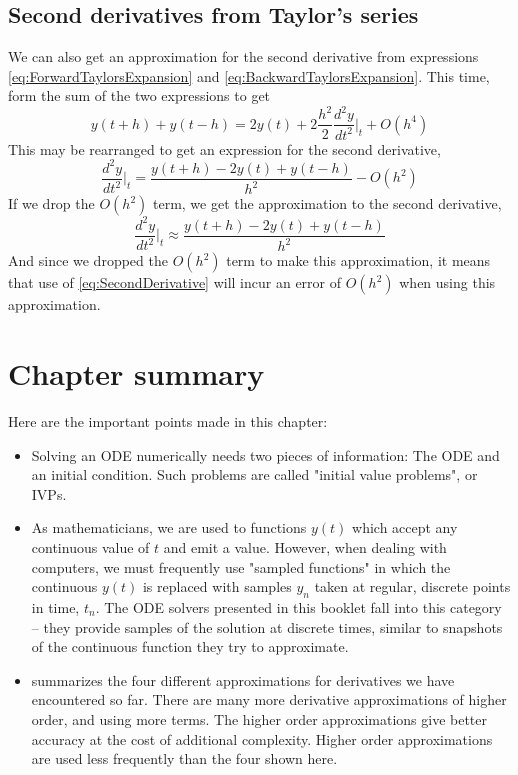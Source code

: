 \documentclass[hidelinks,notitlepage]{book}
\begin{document}
\subsection{Second derivatives from Taylor's series}
We can also get an approximation for the second derivative from expressions \cref{eq:ForwardTaylorsExpansion} and \cref{eq:BackwardTaylorsExpansion}.  This time, form the sum of the two expressions to get
\begin{equation}
\nonumber
\label{eq:TaylorsExpansionSum}
y(t+h) + y(t-h) = 2 y(t)
+ 2 \frac{h^2}{2} \frac{d^2 y}{d t^2} \biggr\rvert_{t}
+O(h^4)
\end{equation}
This may be rearranged to get an expression for the second derivative,
\begin{equation}
\nonumber
\frac{d^2 y}{d t^2} \biggr\rvert_{t} =
\frac{y(t+h) -2 y(t) + y(t-h)}
{h^2}
-O(h^2)
\end{equation}
If we drop the $O(h^2)$ term, we get the approximation to the second derivative,
\begin{equation}
\label{eq:SecondDerivative}
\frac{d^2 y}{d t^2} \biggr\rvert_{t} \approx
\frac{y(t+h) -2 y(t) + y(t-h)}
{h^2}
\end{equation}
And since we dropped the $O(h^2)$ term to make this approximation, it means that use of \cref{eq:SecondDerivative} will incur an error of  $O(h^2)$ when using this approximation.

\section{Chapter summary}
Here are the important points made in this chapter:
\begin{itemize}
	\item Solving an ODE numerically needs two pieces of information:  The ODE and an initial condition.  Such problems are called "initial value problems", or IVPs.
	\item As mathematicians, we are used to functions $y(t)$ which accept any continuous value of $t$ and emit a value.  However, when dealing with computers, we must frequently use "sampled functions" in which the continuous $y(t)$ is replaced with samples $y_n$ taken at regular, discrete points in time, $t_n$.  The ODE solvers presented in this booklet fall into this category -- they provide samples of the solution at discrete times, similar to snapshots of the continuous function they try to approximate.
	\item {} summarizes the four different approximations for derivatives we have encountered so far.  There are many more derivative approximations of higher order, and using more terms.  The higher order approximations give better accuracy at the cost of additional complexity.  Higher order approximations are used less frequently than the four shown here.
\end{itemize}
\end{document}
